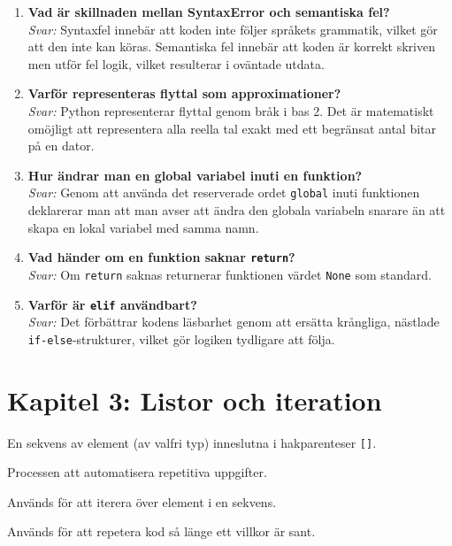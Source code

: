 \documentclass[11pt,a4paper]{article}
\begin{document}
\begin{enumerate}[label=\bfseries\color{primary}Fråga \arabic*:, leftmargin=1.8cm]
    \item \textbf{Vad är skillnaden mellan SyntaxError och semantiska fel?}
    \\ \textit{Svar:} Syntaxfel innebär att koden inte följer språkets grammatik, vilket gör att den inte kan köras. Semantiska fel innebär att koden är korrekt skriven men utför fel logik, vilket resulterar i oväntade utdata.
    
    \item \textbf{Varför representeras flyttal som approximationer?}
    \\ \textit{Svar:} Python representerar flyttal genom bråk i bas 2. Det är matematiskt omöjligt att representera alla reella tal exakt med ett begränsat antal bitar på en dator.
    
    \item \textbf{Hur ändrar man en global variabel inuti en funktion?}
    \\ \textit{Svar:} Genom att använda det reserverade ordet \texttt{global} inuti funktionen deklarerar man att man avser att ändra den globala variabeln snarare än att skapa en lokal variabel med samma namn.
    
    \item \textbf{Vad händer om en funktion saknar \texttt{return}?}
    \\ \textit{Svar:} Om \texttt{return} saknas returnerar funktionen värdet \texttt{None} som standard.
    
    \item \textbf{Varför är \texttt{elif} användbart?}
    \\ \textit{Svar:} Det förbättrar kodens läsbarhet genom att ersätta krångliga, nästlade \texttt{if-else}-strukturer, vilket gör logiken tydligare att följa.
\end{enumerate}

\section{Kapitel 3: Listor och iteration}

\begin{description}[style=nextline, leftmargin=1cm, labelindent=0.5cm]
    \item[\color{primary}Lista] En sekvens av element (av valfri typ) inneslutna i hakparenteser \texttt{[]}.
    \item[\color{primary}Iteration] Processen att automatisera repetitiva uppgifter.
    \item[\color{primary}for-loop] Används för att iterera över element i en sekvens.
    \item[\color{primary}while-loop] Används för att repetera kod så länge ett villkor är sant.
\end{description}
\end{document}
